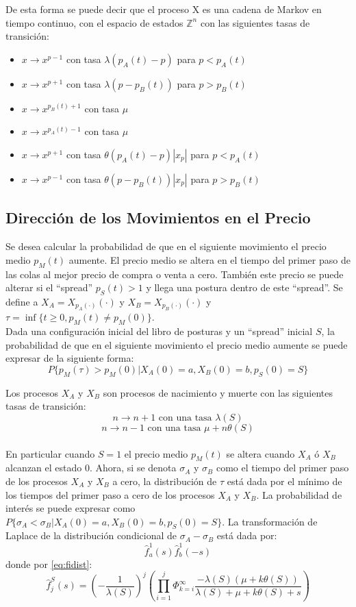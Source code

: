 \documentclass[11pt]{article}
\numberwithin{equation}{section} %
\begin{document}
De esta forma se puede decir que el proceso X es una cadena de Markov en tiempo continuo, con el espacio de estados $\mathbb{Z}^n$ con las siguientes tasas de transición:
\begin{itemize}
\item $x\rightarrow x^{p-1}$ con tasa $\lambda(p_A(t)-p)$ para $p<p_A(t)$
\item $x\rightarrow x^{p+1}$ con tasa $\lambda(p-p_B(t))$ para $p>p_B(t)$
\item $x\rightarrow x^{p_B(t)+1}$ con tasa $\mu$
\item $x\rightarrow x^{p_A(t)-1}$ con tasa $\mu$
\item $x\rightarrow x^{p+1}$ con tasa $\theta(p_A(t)-p)|x_p|$ para $p<p_A(t)$
\item $x\rightarrow x^{p-1}$ con tasa $\theta(p-p_B(t))|x_p|$ para $p>p_B(t)$
\end{itemize}

\subsection{Dirección de los Movimientos en el Precio}

Se desea calcular la probabilidad de que en el siguiente movimiento el precio medio $p_M(t)$ aumente. El precio medio se altera en el tiempo del primer paso de las colas al mejor precio de compra o venta a cero. También este precio se puede alterar si el ``spread'' $p_S(t)>1$ y llega una postura dentro de este ``spread''. Se define a $X_A=X_{p_A(\cdot)}(\cdot)$ y $X_B=X_{p_B(\cdot)}(\cdot)$ y $\tau=\inf\{t\geq 0, p_M(t) \neq p_M(0)\}$.\\

Dada una configuración inicial del libro de posturas y un ``spread'' inicial $S$, la probabilidad de que en el siguiente movimiento el precio medio aumente se puede expresar de la siguiente forma:
\[
P\{p_M(\tau)>p_M(0)|X_A(0)=a,X_B(0)=b,p_S(0)=S\}
\]

Los procesos $X_A$ y $X_B$ son procesos de nacimiento y muerte con las siguientes tasas de transición:
\[
n\rightarrow n+1 \text{ con una tasa }\lambda(S)
\]
\[
n\rightarrow n-1 \text{ con una tasa }\mu+n\theta(S)
\]\\

En particular cuando $S=1$ el precio medio $p_M(t)$ se altera cuando $X_A$ ó $X_B$ alcanzan el estado 0. Ahora, si se denota $\sigma_A$ y $\sigma_B$ como el tiempo del primer paso de los procesos $X_A$ y $X_B$ a cero, la distribución de $\tau$ está dada por el mínimo de los tiempos del primer paso a cero de los procesos $X_A$ y $X_B$. La probabilidad de interés se puede expresar como $P\{\sigma_A<\sigma_B|X_A(0)=a,X_B(0)=b,p_S(0)=S\}$. La transformación de Laplace de la distribución condicional de $\sigma_A-\sigma_B$ está dada por:
\[
\hat{f}_a^1(s)\hat{f}_b^1(-s)
\]
donde por \ref{eq:fidist}:
\[
\hat{f}_{j}^S(s)=\left(-\frac{1}{\lambda(S)}\right)^j\left( \prod_{i=1}^j \Phi_{k=i}^\infty \frac{-\lambda(S)(\mu+k\theta(S))}{\lambda(S)+\mu+k\theta(S)+s} \right)
\]\\
\end{document}
